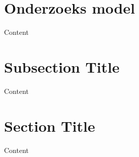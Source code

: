 \section{Onderzoeks model}

Content


\section{Subsection Title}

Content


\section{Section Title}

Content